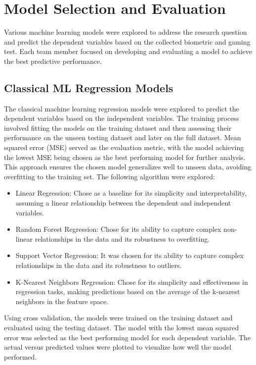 \section{Model Selection and Evaluation}
Various machine learning models were explored to address the research question and predict the dependent variables based on the collected biometric and gaming test. Each team member
focused on developing and evaluating a model to achieve the best predictive performance. 

\subsection{Classical ML Regression Models}
The classical machine learning regression models were explored to predict the dependent variables based on the independent variables. 
The training process involved fitting the models on the training dataset and then assessing their performance on the unseen testing dataset and later on the full dataset.
Mean squared error (MSE) served as the evaluation metric,
with the model achieving the lowest MSE being chosen as the best performing model for further analysis. This approach ensures the chosen model generalizes well to unseen data, avoiding
overfitting to the training set. The following algorithm were explored:

\begin{itemize}
    \item Linear Regression: Chose as a baseline for its simplicity and interpretability, assuming a linear relationship between the dependent and independent variables. \cite{poole1971assumptions}
    \item Random Forest Regression: Chose for its ability to capture complex non-linear relationships in the data and its robustness to overfitting. \cite{liu2012new}
    \item Support Vector Regression: It was chosen for its ability to capture complex relationships in the data and its robustness to outliers. \cite{mangasarian2000robust}
    \item K-Nearest Neighbors Regression: Chose for its simplicity and effectiveness in regression tasks, making predictions based on the average of the k-nearest neighbors in the feature space. \cite{song2017efficient}
\end{itemize}

Using cross validation, the models were trained on the training dataset and evaluated using the testing dataset. The model with the lowest mean squared error was selected as the best performing
model for each dependent variable. The actual versus predicted values were plotted to visualize how well the model performed. 

